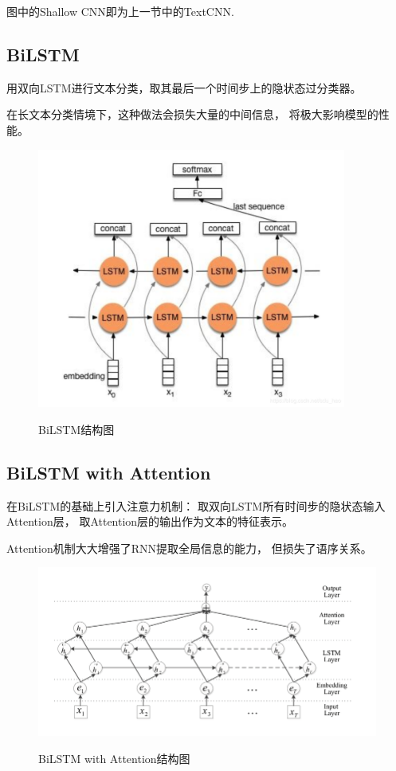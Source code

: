 \documentclass[12pt, UTF8, a4paper]{ctexart}
\begin{document}
图中的Shallow CNN即为上一节中的TextCNN.

\subsection{BiLSTM}

用双向LSTM进行文本分类，取其最后一个时间步上的隐状态过分类器。

在长文本分类情境下，这种做法会损失大量的中间信息，
将极大影响模型的性能。

\begin{figure}[htb]
    \centering
    \includegraphics[width=4in, keepaspectratio]{./pic/rnn.png}\\
    \caption{BiLSTM结构图}
\end{figure}

\subsection{BiLSTM with Attention}

在BiLSTM的基础上引入注意力机制：
取双向LSTM所有时间步的隐状态输入Attention层，
取Attention层的输出作为文本的特征表示。

Attention机制大大增强了RNN提取全局信息的能力，
但损失了语序关系。

\begin{figure}[htb]
    \centering
    \includegraphics[width=5in, keepaspectratio]{./pic/attn.png}\\
    \caption{BiLSTM with Attention结构图}
\end{figure}
\end{document}
